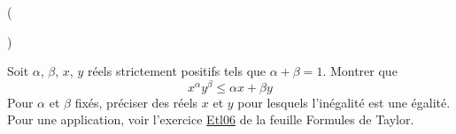 \begin{tiny}()\end{tiny}
Soit $\alpha$, $\beta$, $x$, $y$ réels strictement positifs tels que $\alpha+\beta=1$. Montrer que
\begin{displaymath}
 x^\alpha y^\beta \leq \alpha x + \beta y
\end{displaymath}
Pour $\alpha$ et $\beta$ fixés, préciser des réels $x$ et $y$ pour lesquels l'inégalité est une égalité.
Pour une application, voir l'exercice \hyperref{\baseurl temptex/fextl.pdf}{exo}{Etl06}{Etl06} de la feuille Formules de Taylor.
